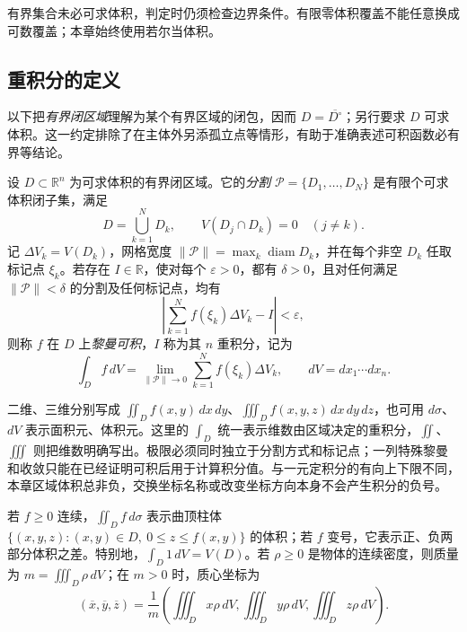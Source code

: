 \begin{notealert}[type=caution,title={有界与可求体积是不同条件}]
有界集合未必可求体积，判定时仍须检查边界条件。有限零体积覆盖不能任意换成可数覆盖；本章始终使用若尔当体积。
\end{notealert}

\subsection{重积分的定义}
\label{subsec:definition-of-multiple-integrals}

以下把\emph{有界闭区域}理解为某个有界区域的闭包，因而 $D=\overline{D^\circ}$；另行要求 $D$ 可求体积。这一约定排除了在主体外另添孤立点等情形，有助于准确表述可积函数必有界等结论。

\begin{definition}
\label{def:multiple-riemann-integral}
设 $D\subset\mathbb R^n$ 为可求体积的有界闭区域。它的\emph{分割} $\mathcal P=\{D_1,\ldots,D_N\}$ 是有限个可求体积闭子集，满足
\[
    D=\bigcup_{k=1}^ND_k,\qquad V(D_j\cap D_k)=0\quad(j\ne k).
\]
记 $\Delta V_k=V(D_k)$，网格宽度 $\|\mathcal P\|=\max_k\operatorname{diam}D_k$，并在每个非空 $D_k$ 任取标记点 $\xi_k$。若存在 $I\in\mathbb R$，使对每个 $\varepsilon>0$，都有 $\delta>0$，且对任何满足 $\|\mathcal P\|<\delta$ 的分割及任何标记点，均有
\[
    \left|\sum_{k=1}^Nf(\xi_k)\Delta V_k-I\right|<\varepsilon,
\]
则称 $f$ 在 $D$ 上\emph{黎曼可积}，$I$ 称为其 $n$ 重积分，记为
\begin{equation}
    \int_D f\,dV=\lim_{\|\mathcal P\|\to0}
    \sum_{k=1}^Nf(\xi_k)\Delta V_k,
    \qquad dV=dx_1\cdots dx_n.
    \label{eq:multiple-riemann-definition}
\end{equation}
\end{definition}

二维、三维分别写成 $\iint_D f(x,y)\,dx\,dy$、$\iiint_D f(x,y,z)\,dx\,dy\,dz$，也可用 $d\sigma$、$dV$ 表示面积元、体积元。这里的 $\int_D$ 统一表示维数由区域决定的重积分，$\iint$、$\iiint$ 则把维数明确写出。极限必须同时独立于分割方式和标记点；一列特殊黎曼和收敛只能在已经证明可积后用于计算积分值。与一元定积分的有向上下限不同，本章区域体积总非负，交换坐标名称或改变坐标方向本身不会产生积分的负号。

若 $f\geq0$ 连续，$\iint_D f\,d\sigma$ 表示曲顶柱体 $\{(x,y,z):(x,y)\in D,\ 0\leq z\leq f(x,y)\}$ 的体积；若 $f$ 变号，它表示正、负两部分体积之差。特别地，$\int_D1\,dV=V(D)$。若 $\rho\geq0$ 是物体的连续密度，则质量为 $m=\iiint_D\rho\,dV$；在 $m>0$ 时，质心坐标为
\begin{equation}
    (\overline x,\overline y,\overline z)
    =\frac1m\left(\iiint_Dx\rho\,dV,
    \iiint_Dy\rho\,dV,\iiint_Dz\rho\,dV\right).
    \label{eq:multiple-mass-centroid}
\end{equation}

